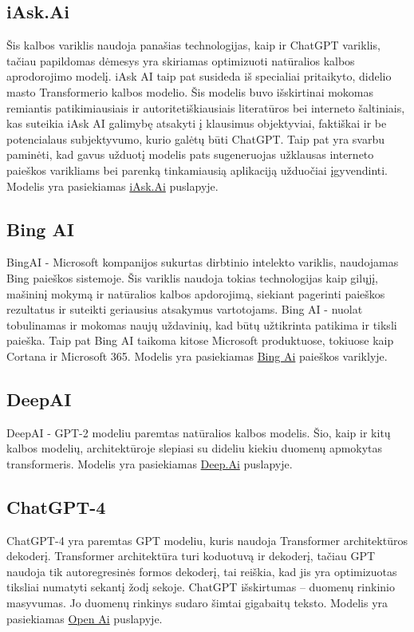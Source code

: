 \documentclass[conference]{IEEEtran}
\begin{document}
\subsection{iAsk.Ai}
Šis kalbos variklis naudoja panašias technologijas, kaip ir ChatGPT variklis, tačiau
papildomas dėmesys yra skiriamas optimizuoti natūralios kalbos aprodorojimo modelį. \cite{iaskai} iAsk AI taip pat susideda iš specialiai pritaikyto,
didelio masto Transformerio kalbos modelio. Šis modelis buvo išskirtinai mokomas remiantis
patikimiausiais ir autoritetiškiausiais literatūros bei interneto šaltiniais,
kas suteikia iAsk AI galimybę atsakyti į klausimus objektyviai,
faktiškai ir be potencialaus subjektyvumo, kurio galėtų būti ChatGPT. Taip pat yra svarbu paminėti,
kad gavus užduotį modelis pats sugeneruojas užklausas interneto paieškos
varikliams bei parenką tinkamiausią aplikaciją užduočiai įgyvendinti. Modelis yra pasiekiamas 
\href{https://iask.ai/}{iAsk.Ai} puslapyje.

\subsection{Bing AI}
BingAI - Microsoft kompanijos sukurtas dirbtinio intelekto variklis, naudojamas Bing paieškos sistemoje. \cite{bing} Šis variklis naudoja tokias technologijas kaip gilųjį, mašininį mokymą ir natūralios kalbos apdorojimą, siekiant pagerinti paieškos rezultatus ir suteikti geriausius atsakymus vartotojams. Bing AI - nuolat tobulinamas ir mokomas naujų uždavinių, kad būtų užtikrinta patikima ir tiksli paieška. Taip pat Bing AI taikoma kitose Microsoft produktuose, tokiuose kaip Cortana ir Microsoft 365. Modelis yra pasiekiamas 
\href{https://www.bing.com/?/ai/}{Bing Ai} paieškos variklyje.

\subsection{DeepAI}
DeepAI - GPT-2 modeliu paremtas natūralios kalbos modelis. \cite{deepai} Šio, kaip ir kitų kalbos modelių, architektūroje slepiasi su dideliu kiekiu duomenų apmokytas transformeris. Modelis yra pasiekiamas 
\href{https://deep.ai/}{Deep.Ai} puslapyje.

\subsection{ChatGPT-4}
ChatGPT-4 yra paremtas GPT modeliu, kuris naudoja Transformer architektūros dekoderį.\cite{chatgpt} Transformer architektūra turi koduotuvą ir dekoderį, tačiau GPT naudoja tik autoregresinės formos dekoderį, tai reiškia, kad jis yra optimizuotas tiksliai numatyti sekantį žodį sekoje. ChatGPT išskirtumas – duomenų rinkinio masyvumas. Jo duomenų rinkinys sudaro šimtai gigabaitų teksto. Modelis yra pasiekiamas 
\href{https://chat.openai.lt}{Open Ai} puslapyje.
\end{document}
